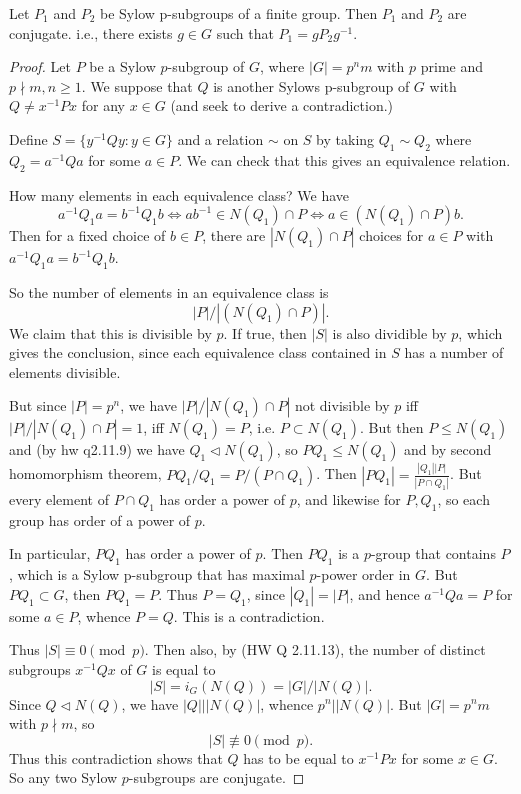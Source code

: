 \begin{theorem}
    Let $P_1$ and $P_2$ be Sylow p-subgroups of a finite group. Then $P_1$ and $P_2$ are conjugate.
    i.e., there exists $g \in G$ such that $P_1 = gP_2g^{-1}$.
\end{theorem}
\begin{proof}
	Let $P$ be a Sylow $p$-subgroup of $G$, where $|G| = p^n m$ with $p$ prime and $p \nmid m, n\ge 1$. We suppose that $Q$ is another Sylows p-subgroup of $G$ with $Q \neq  x^{-1} P x$ for any $x \in G$ (and seek to derive a contradiction.)

	Define  $S = \{y^{-1} Qy: y \in G\} $ and a relation $\sim $ on $S$ by taking $Q_1 \sim Q_2 $ where $Q_2 = a^{-1} Qa$ for some $a \in P$. We can check that this gives an equivalence relation.

	How many elements in each equivalence class? We have
	\[
		a^{-1} Q_1a = b^{-1} Q_1b \iff ab^{-1} \in N(Q_1) \cap P \iff a \in \left( N(Q_1) \cap P \right) b
	.\] 
	Then for a fixed choice of $b \in P$, there are  $\left| N(Q_1) \cap P \right| $ choices for $a \in P$ with $a^{-1} Q_1a = b^{-1} Q_1 b$.

	So the number of elements in an equivalence class is \[
		|P| / |(N(Q_1) \cap P) |
	.\] 
	We claim that this is divisible by $p$.
	If true, then $|S|$ is also dividible by $p$, which gives the conclusion, since each equivalence class contained in $S$ has a number of elements divisible.

	But since $|P| = p^n$, we have $|P| / |N(Q_1) \cap P|$ not divisible by $p$ iff $|P| / |N(Q_1) \cap P| = 1$, iff $N(Q_1) = P$, i.e. $P \subset N(Q_1)$.
	But then $P \le N(Q_1)$ and (by hw q2.11.9) we have $Q_1 \triangleleft N(Q_1)$, so $PQ_1 \le N(Q_1)$ and by second homomorphism theorem, $PQ_1 / Q_1 = P / (P \cap Q_1)$. Then $|PQ_1| = \frac{|Q_1| |P|}{|P \cap Q_1|}$. But every element of $P \cap Q_1$ has order a power of $ p$, and likewise for $P, Q_1$, so each group has order of a power of $p$.

	In particular, $PQ_1$ has order a power of $p$. Then $PQ_1$ is a $p$-group that contains $P$, which is a Sylow p-subgroup that has maximal $p$-power order in $G$. But $PQ_1 \subset G$, then $PQ_1 = P$. Thus $P = Q_1$, since $|Q_1| = |P|$, and hence $a^{-1} Q a = P$ for some $a \in P$, whence $P = Q$. This is a contradiction.

	Thus $|S| \equiv 0 \pmod p$. Then also, by (HW Q 2.11.13), the number of distinct subgroups $x^{-1} Q x$ of $G$ is equal to \[
		|S| = i_G (N(Q)) = |G| / |N(Q)|
	.\] 
	Since $Q \triangleleft N(Q)$, we have $|Q| | |N(Q)|$, whence  $p^n | |N(Q)|$. But $|G| = p^n m$ with $p \nmid m$, so
	\[
		|S| \not\equiv 0 \pmod p
	.\]
	Thus this contradiction shows that $Q$ has to be equal to $x^{-1} Px$ for some $x \in G$. So any two Sylow $p$-subgroups are conjugate.
\end{proof}
